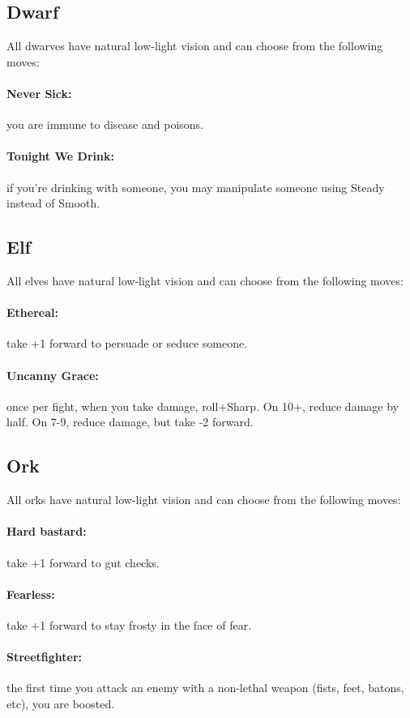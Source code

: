 \subsection{Dwarf}
All dwarves have natural low-light vision and can choose from the following moves:
\paragraph{Never Sick:} you are immune to disease and poisons.
\paragraph{Tonight We Drink:} if you’re drinking with someone, you may manipulate someone using Steady instead of Smooth.

\subsection{Elf}
All elves have natural low-light vision and can choose from the following moves:
\paragraph{Ethereal:} take +1 forward to persuade or seduce someone.
\paragraph{Uncanny Grace:} once per fight, when you take damage, roll+Sharp. On 10+, reduce damage by half. On 7-9, reduce damage, but take -2 forward.

\subsection{Ork}
All orks have natural low-light vision and can choose from the following moves:

\paragraph{Hard bastard:} take +1 forward to gut checks.
\paragraph{Fearless:} take +1 forward to stay frosty in the face of fear.
\paragraph{Streetfighter:} the first time you attack an enemy with a non-lethal weapon (fists, feet, batons, etc), you are boosted.

